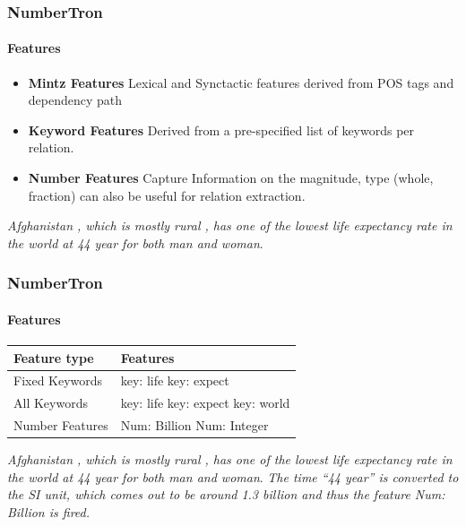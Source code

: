 \documentclass{beamer}
\begin{document}
\begin{frame}
\frametitle{NumberTron}
\framesubtitle{Features}
\begin{itemize}
\setlength \itemsep{2em}
\item \textbf{Mintz Features} Lexical and Synctactic features derived from POS tags and dependency path \cite{mintz}
\item \textbf{Keyword Features}
Derived from a pre-specified list of keywords per relation.
\item \textbf{Number Features} Capture Information on the magnitude, type (whole, fraction) can also be useful for relation extraction.
\end{itemize}

{\color{red}\emph{Afghanistan , which is mostly rural , has one of the lowest life expectancy rate in the world at 44 year for both man and woman}}. 

\end{frame}

\begin{frame}
\frametitle{NumberTron}
\framesubtitle{Features}
\begin{table}
\begin{tabular}{|l|l|}
\hline
Feature type & Features \\
\hline
Fixed Keywords & key: life	key: expect \\
\hline
All Keywords & key: life	key: expect	key: world \\
\hline
Number Features & Num: Billion	Num: Integer \\
\hline
\end{tabular} \end{table}
  
{\color{red}\emph{Afghanistan , which is mostly rural , has one of the lowest life expectancy rate in the world at 44 year for both man and woman}}. 
\textit{The time ``44 year'' is converted to the SI unit, which comes out to be around 1.3 billion and thus the feature Num: Billion is fired.}

\end{frame}
\end{document}
